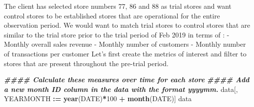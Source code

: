\documentclass[
]{article}
\newenvironment{Shaded}{\begin{snugshade}}{\end{snugshade}}
\newcommand{\DecValTok}[1]{\textcolor[rgb]{0.00,0.00,0.81}{#1}}
\newcommand{\DocumentationTok}[1]{\textcolor[rgb]{0.56,0.35,0.01}{\textbf{\textit{#1}}}}
\newcommand{\FunctionTok}[1]{\textcolor[rgb]{0.13,0.29,0.53}{\textbf{#1}}}
\newcommand{\NormalTok}[1]{#1}
\newcommand{\SpecialCharTok}[1]{\textcolor[rgb]{0.81,0.36,0.00}{\textbf{#1}}}
\begin{document}
The client has selected store numbers 77, 86 and 88 as trial stores and
want control stores to be established stores that are operational for
the entire observation period. We would want to match trial stores to
control stores that are similar to the trial store prior to the trial
period of Feb 2019 in terms of : - Monthly overall sales revenue -
Monthly number of customers - Monthly number of transactions per
customer Let's first create the metrics of interest and filter to stores
that are present throughout the pre-trial period.

\begin{Shaded}
\begin{Highlighting}[]
\DocumentationTok{\#\#\#\# Calculate these measures over time for each store}
\DocumentationTok{\#\#\#\# Add a new month ID column in the data with the format yyyymm.}
\NormalTok{data[, YEARMONTH }\SpecialCharTok{:=} \FunctionTok{year}\NormalTok{(DATE)}\SpecialCharTok{*}\DecValTok{100} \SpecialCharTok{+} \FunctionTok{month}\NormalTok{(DATE)]}
\NormalTok{data}
\end{Highlighting}
\end{Shaded}
\end{document}
